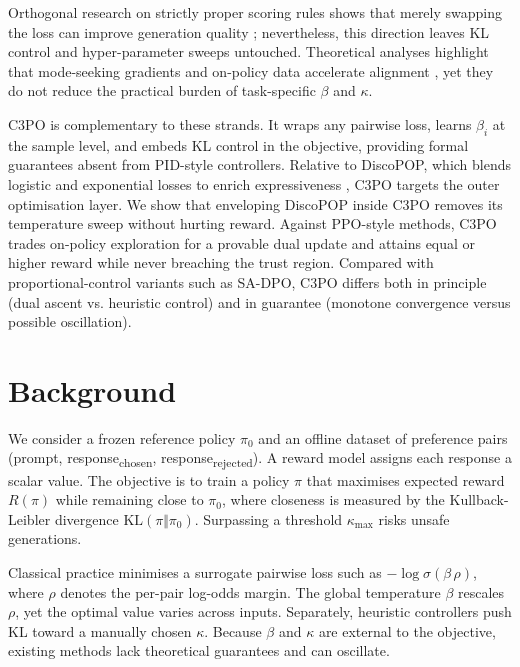\documentclass{article}
\begin{document}
Orthogonal research on strictly proper scoring rules shows that merely swapping the loss can improve generation quality \cite{shao-2024-language}; nevertheless, this direction leaves KL control and hyper-parameter sweeps untouched. Theoretical analyses highlight that mode-seeking gradients and on-policy data accelerate alignment \cite{tajwar-2024-preference}, yet they do not reduce the practical burden of task-specific \(\beta\) and \(\kappa\).

C3PO is complementary to these strands. It wraps any pairwise loss, learns \(\beta_i\) at the sample level, and embeds KL control in the objective, providing formal guarantees absent from PID-style controllers. Relative to DiscoPOP, which blends logistic and exponential losses to enrich expressiveness \cite{lu-2024-discovering}, C3PO targets the outer optimisation layer. We show that enveloping DiscoPOP inside C3PO removes its temperature sweep without hurting reward. Against PPO-style methods, C3PO trades on-policy exploration for a provable dual update and attains equal or higher reward while never breaching the trust region. Compared with proportional-control variants such as SA-DPO, C3PO differs both in principle (dual ascent vs. heuristic control) and in guarantee (monotone convergence versus possible oscillation).

\section{Background}
We consider a frozen reference policy \(\pi_{0}\) and an offline dataset of preference pairs (prompt, response\textsubscript{chosen}, response\textsubscript{rejected}). A reward model assigns each response a scalar value. The objective is to train a policy \(\pi\) that maximises expected reward \(R(\pi)\) while remaining close to \(\pi_{0}\), where closeness is measured by the Kullback-Leibler divergence \(\mathrm{KL}(\pi\Vert\pi_{0})\). Surpassing a threshold \(\kappa_{\max}\) risks unsafe generations.

Classical practice minimises a surrogate pairwise loss such as \(-\log \sigma(\beta\,\rho)\), where \(\rho\) denotes the per-pair log-odds margin. The global temperature \(\beta\) rescales \(\rho\), yet the optimal value varies across inputs. Separately, heuristic controllers push KL toward a manually chosen \(\kappa\). Because \(\beta\) and \(\kappa\) are external to the objective, existing methods lack theoretical guarantees and can oscillate.
\end{document}
